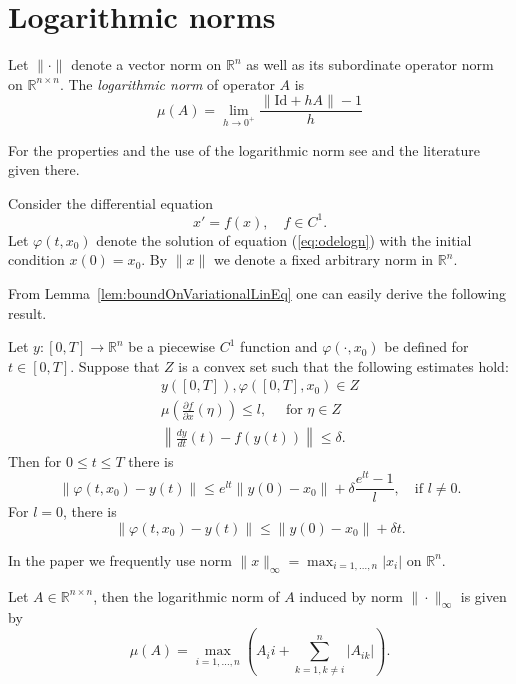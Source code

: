 \section{Logarithmic norms}
\label{sec:lognorm}


\begin{definition} \cite{D58,L58}
\label{def:lognorm}
 Let $\| \cdot \|$ denote a vector norm on $\mathbb{R}^n$  as
well as its subordinate operator norm on $\mathbb{R}^{n
\times n}$. The \emph{logarithmic
norm} of operator $A$ is
\begin{equation}
  \mu(A)=\lim_{h \to 0^+} \frac{\|\mathrm{Id} + hA \| - 1}{h} \label{eq:lnormdef}
\end{equation}
\end{definition}
For the properties and the use of the logarithmic norm see \cite{KZ} and the literature given there.



Consider the differential equation
\begin{equation}
  x'=f(x), \quad \mbox{$f \in C^1$}. \label{eq:odelogn}
\end{equation}
Let $\varphi(t,x_0)$  denote the solution of equation
(\ref{eq:odelogn}) with the initial condition $x(0)=x_0$. By $\|x
\|$ we denote a fixed arbitrary norm in $\mathbb{R}^n$.


From Lemma~\ref{lem:boundOnVariationalLinEq} one can easily derive the following result.
\begin{lemma}
\label{lem:estmLogN} Let $y:[0,T] \to \mathbb{R}^n$ be a piecewise
$C^1$ function and $\varphi(\cdot,x_0)$ be defined for $t \in
[0,T]$. Suppose that $Z$ is a convex set such that   the following
estimates hold:
\begin{eqnarray*}
  y([0,T]), \varphi([0,T], x_0) \in Z  \\
  \mu\left(\frac{\partial f}{\partial x}(\eta)\right) \leq l,\quad \mbox{ for $\eta \in Z$} \\
  \left\| \frac{dy}{dt}(t) - f(y(t)) \right\| \leq \delta.
\end{eqnarray*}
Then for $0 \leq t \leq T$ there is
\begin{displaymath}
 \| \varphi(t,x_0) - y(t)  \| \leq e^{lt}  \|y(0) - x_0 \| + \delta \frac{e^{lt} -1}{l},\quad \mbox{if $l \neq 0$}.
\end{displaymath}
For $l=0$, there is
\begin{displaymath}
 \| \varphi(t,x_0) - y(t)  \| \leq  \|y(0) - x_0 \| + \delta t.
\end{displaymath}
\end{lemma}


In the paper we frequently use norm  $\|x\|_{\infty}=\max_{i=1,\dots,n} |x_i|$ on $\mathbb{R}^n$.  
\begin{lemma}
\label{lem:logNormMax}
  Let $A \in \mathbb{R}^{n \times  n}$, then the logarithmic norm of $A$ induced by norm $\| \cdot \|_\infty$ is given by
  \begin{equation}
    \mu(A)=\max_{i=1,\dots,n} \left( A_ii + \sum_{k=1 , k\neq i}^n |A_{ik}| \right). \label{eq:logNormMax}
  \end{equation}
 \end{lemma}
